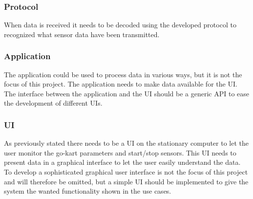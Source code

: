 \subsubsection*{Protocol}
When data is received it needs to be decoded using the developed protocol to recognized what sensor data have been transmitted.


\subsubsection*{Application}
The application could be used to process data in various ways, but it is not the focus of this project.
The application needs to make data available for the UI.
The interface between the application and the UI should be a generic API to ease the development of different UIs. 

\subsubsection*{UI}
As previously stated there needs to be a UI on the stationary computer to let the user monitor the go-kart parameters and start/stop sensors. 
This UI needs to present data in a graphical interface to let the user easily understand the data. 
To develop a sophisticated graphical user interface is not the focus of this project and will therefore be omitted, but a simple UI should be implemented to give the system the wanted functionality shown in the use cases.
